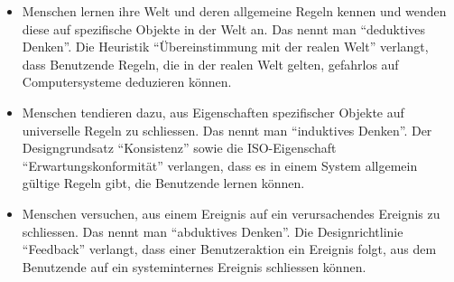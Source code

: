 \begin{itemize}

  \item{
    Menschen lernen ihre Welt und deren allgemeine Regeln kennen und wenden diese auf spezifische Objekte in der Welt an.
    Das nennt man \enquote{deduktives Denken}. 
    Die Heuristik \enquote{Übereinstimmung mit der realen Welt} verlangt,
    dass Benutzende Regeln, die in der realen Welt gelten,
    gefahrlos auf Computersysteme deduzieren können.
  }

  \item{
    Menschen tendieren dazu, 
    aus Eigenschaften spezifischer Objekte auf universelle Regeln zu schliessen.
    Das nennt man \enquote{induktives Denken}.
    Der Designgrundsatz \enquote{Konsistenz} sowie die ISO-Eigenschaft \enquote{Erwartungskonformität} verlangen,
    dass es in einem System allgemein gültige Regeln gibt,
    die Benutzende lernen können.
  }

  \item{
    Menschen versuchen,
    aus einem Ereignis auf ein verursachendes Ereignis zu schliessen.
    Das nennt man \enquote{abduktives Denken}. 
    Die Designrichtlinie \enquote{Feedback} verlangt,
    dass einer Benutzeraktion ein Ereignis folgt,
    aus dem Benutzende auf ein systeminternes Ereignis schliessen können.
  }
\end{itemize}